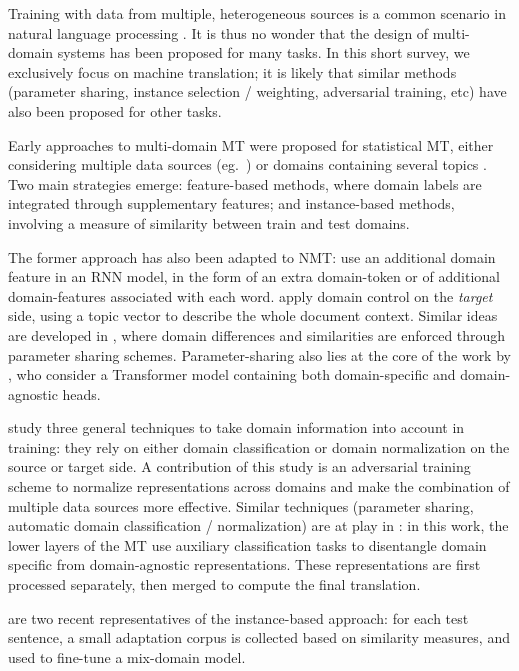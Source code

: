 \documentclass[11pt,a4paper]{article}
\begin{document}
Training with data from multiple, heterogeneous sources is a common scenario in natural language processing \cite{Dredze08online,Finkel09hierarchical}. It is thus no wonder that the design of multi-domain systems has been proposed for many tasks. In this short survey, we exclusively focus on machine translation; it is likely that similar methods (parameter sharing, instance selection / weighting, adversarial training, etc) have also been proposed for other tasks.

Early approaches to multi-domain MT were proposed for statistical MT, either considering multiple data sources (eg.\ \cite{Banerjee10combining,Clark12onesystem,Sennrich13multidomain,Huck15mixeddomain}) or domains containing several topics \cite{Eidelman12topic,Hasler14dynamic-topic}. Two main strategies emerge: feature-based methods, where domain labels are integrated through supplementary features; and instance-based methods, involving a measure of similarity between train and test domains. 

The former approach has also been adapted to NMT:  use an additional domain feature in an RNN model, in the form of an extra domain-token or of additional domain-features associated with each word. \citet{Chen16guided} apply domain control on the \emph{target} side, using a topic vector to describe the whole document context. Similar ideas are developed in \cite{Chu18multilingual,Pham19generic}, where domain differences and similarities are enforced through parameter sharing schemes. Parameter-sharing also lies at the core of the work by \citet{Jiang19multidomain}, who consider a Transformer model containing both domain-specific and domain-agnostic heads.

\citet{Britz17mixing} study three general techniques to take domain information into account in training: they rely on either domain classification or domain normalization on the source or target side. A contribution of this study is an adversarial training scheme to normalize representations across domains and make the combination of multiple data sources more effective. Similar techniques (parameter sharing, automatic domain classification / normalization) are at play in \cite{Zeng18multidomain}: in this work, the lower layers of the MT use auxiliary classification tasks to disentangle domain specific from domain-agnostic representations. These representations are first processed separately, then merged to compute the final translation.

\citet{Farajian17multidomain,li-etal-2018-one} are two recent representatives of the instance-based approach: for each test sentence, a small adaptation corpus is collected based on similarity measures, and used to fine-tune a mix-domain model.
\end{document}
